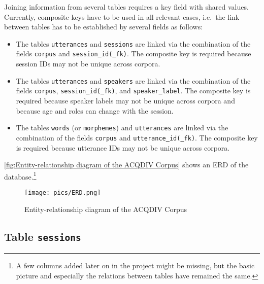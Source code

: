 \documentclass[a4paper, 11pt]{book}
\newcommand{\und}{\underline{{ }}\hspace{0.2mm}}	%
\begin{document}
Joining information from several tables requires a key field with shared values. Currently, composite keys have to be used in all relevant cases, i.e.\ the link between tables has to be established by several fields as follows: 

\begin{itemize}
	\item The tables \texttt{utterances} and \texttt{sessions} are linked via the combination of the fields \texttt{corpus} and \texttt{session\und id(\und fk)}.  
		The composite key is required because session IDs may not be unique across corpora. 
	\item The tables \texttt{utterances} and \texttt{speakers} are linked via the combination of the fields \texttt{corpus}, \texttt{session\und id(\und fk)}, 
		and \texttt{speaker\und label}. The composite key is required because speaker labels may not be unique across corpora and because age and roles 
		can change with the session. 
	\item The tables \texttt{words} (or \texttt{morphemes}) and \texttt{utterances} are linked via the combination of the fields \texttt{corpus} and 
		\texttt{utterance\und id(\und fk)}. The composite key is required because utterance IDs may not be unique across corpora. 
\end{itemize}

\autoref{fig:Entity-relationship diagram of the ACQDIV Corpus} shows an ERD of the database.\footnote{A few columns added later on in the project might be missing, but the basic picture and especially the relations between tables have remained the same.}

\begin{landscape}
\begin{figure}
	\centering
	\texttt{[image: pics/ERD.png]}
	\caption{Entity-relationship diagram of the ACQDIV Corpus}
	\label{fig:Entity-relationship diagram of the ACQDIV Corpus}
\end{figure}
\end{landscape}

\subsection{Table \texttt{sessions}}
\label{subsec:Table sessions}
\end{document}
